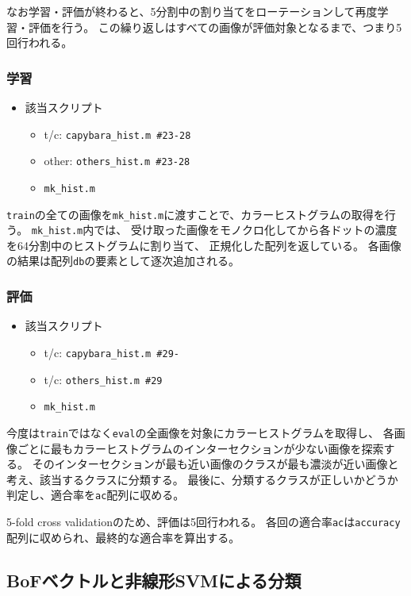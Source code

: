 \documentclass[11pt,a4paper, uplatex]{jsreport}
\begin{document}
なお学習・評価が終わると、5分割中の割り当てをローテーションして再度学習・評価を行う。
この繰り返しはすべての画像が評価対象となるまで、つまり5回行われる。
\subsubsection{学習}
\begin{itemize}
  \item 該当スクリプト
  \begin{itemize}
    \item t/c: \texttt{capybara_hist.m \#23-28}
    \item other: \texttt{others_hist.m \#23-28}
    \item \texttt{mk_hist.m}
  \end{itemize}
\end{itemize}
\texttt{train}の全ての画像を\texttt{mk_hist.m}に渡すことで、カラーヒストグラムの取得を行う。
\texttt{mk_hist.m}内では、
受け取った画像をモノクロ化してから各ドットの濃度を64分割中のヒストグラムに割り当て、
正規化した配列を返している。
各画像の結果は配列\texttt{db}の要素として逐次追加される。
\subsubsection{評価}
\begin{itemize}
  \item 該当スクリプト
  \begin{itemize}
    \item t/c: \texttt{capybara_hist.m \#29-}
    \item t/c: \texttt{others_hist.m \#29}
    \item \texttt{mk_hist.m}
  \end{itemize}
\end{itemize}
今度は\texttt{train}ではなく\texttt{eval}の全画像を対象にカラーヒストグラムを取得し、
各画像ごとに最もカラーヒストグラムのインターセクションが少ない画像を探索する。
そのインターセクションが最も近い画像のクラスが最も濃淡が近い画像と考え、該当するクラスに分類する。
最後に、分類するクラスが正しいかどうか判定し、適合率を\texttt{ac}配列に収める。

5-fold cross validationのため、評価は5回行われる。
各回の適合率\texttt{ac}は\texttt{accuracy}配列に収められ、最終的な適合率を算出する。
\subsection{BoFベクトルと非線形SVMによる分類}\label{sec:descBof}
\end{document}
